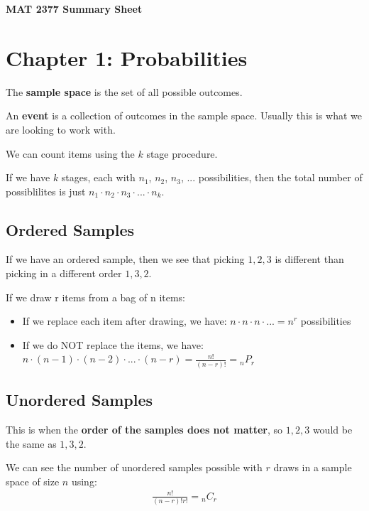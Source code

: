 \documentclass[12pt,letterpaper]{article} \usepackage{amsmath} \usepackage{graphicx} \usepackage[margin=1in]{geometry} \usepackage{longtable}  \usepackage{amssymb}
\begin{document}
	
	\begin{center}
		\Large\textbf{MAT 2377 Summary Sheet} \\
		\vspace{0.5em}
	\end{center}
	
	\section{Chapter 1: Probabilities}
	The \textbf{sample space} is the set of all possible outcomes. 
	
	An \textbf{event} is a collection of outcomes in the sample space. Usually this is what we are looking to work with. 
	
	We can count items using the $k$ stage procedure. 
	
	If we have $k$ stages, each with $n_1$, $n_2$, $n_3$, ... possibilities, then the total number of possiblilites is just $n_1\cdot n_2\cdot n_3\cdot ...\cdot n_k$.
	
	\subsection{Ordered Samples}
	If we have an ordered sample, then we see that picking $1, 2, 3$ is different than picking in a different order $1, 3, 2$.
	
	If we draw r items from a bag of n items:
	\begin{itemize}[]
		\item If we replace each item after drawing, we have: $n\cdot n\cdot n\cdot ... = n^r$ possibilities
		\item If we do NOT replace the items, we have: $n\cdot (n-1)\cdot (n-2)\cdot ...\cdot (n-r) = \frac{n!}{(n-r)!}= {}_nP_r$
	\end{itemize}
	
	\subsection{Unordered Samples}
	This is when the \textbf{order of the samples does not matter}, so $1,2,3$ would be the same as $1,3,2$. 
	
	We can see the number of unordered samples possible with $r$ draws in a sample space of size $n$ using:
	\begin{align*}
		\frac{n!}{(n-r)!r!} = {}_nC_r
	\end{align*}
\end{document}
